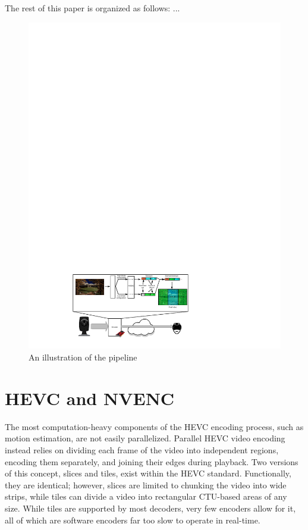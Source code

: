 The rest of this paper is organized as follows: ...


\begin{figure}[t]
	\centering
	\includegraphics[width=\textwidth]{figures/Visio-Streaming_scenario_v1.pdf}
	\caption{An illustration of the pipeline}
\end{figure}

\section{HEVC and NVENC}

The most computation-heavy components of the HEVC encoding process, such as motion estimation, are not easily parallelized. Parallel HEVC video encoding instead relies on dividing each frame of the video into independent regions, encoding them separately, and joining their edges during playback. Two versions of this concept, slices and tiles, exist within the HEVC standard. Functionally, they are identical; however, slices are limited to chunking the video into wide strips, while tiles can divide a video into rectangular CTU-based areas of any size. While tiles are supported by most decoders, very few encoders allow for it, all of which are software encoders far too slow to operate in real-time.

